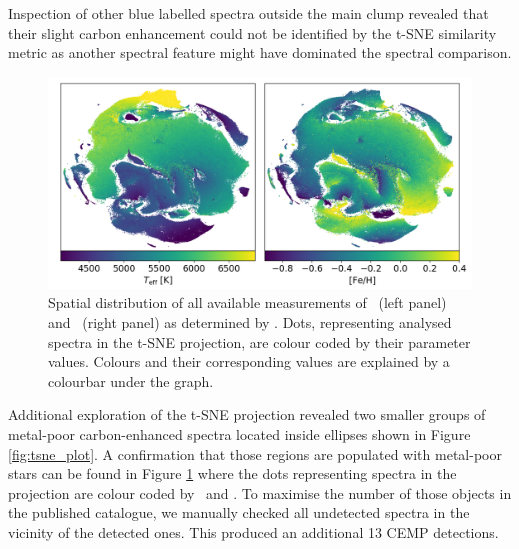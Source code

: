 Inspection of other blue labelled spectra outside the main clump revealed that their slight carbon enhancement could not be identified by the t-SNE similarity metric as another spectral feature might have dominated the spectral comparison.

\begin{figure}
	\centering
	\includegraphics[width=\textwidth]{tsne_params_notitle.png}
	\caption{Spatial distribution of all available measurements of \Teff\ (left panel) and \Feh\ (right panel) as determined by \TC. Dots, representing analysed spectra in the t-SNE projection, are colour coded by their parameter values. Colours and their corresponding values are explained by a colourbar under the graph.}
	\label{fig:tsne_teff_feh}
\end{figure}

Additional exploration of the t-SNE projection revealed two smaller groups of metal-poor carbon-enhanced spectra located inside ellipses shown in Figure \ref{fig:tsne_plot}. A confirmation that those regions are populated with metal-poor stars can be found in Figure \ref{fig:tsne_teff_feh} where the dots representing spectra in the projection are colour coded by \Feh\ and \Teff. To maximise the number of those objects in the published catalogue, we manually checked all undetected spectra in the vicinity of the detected ones. This produced an additional 13 CEMP detections.

